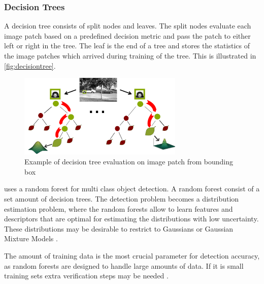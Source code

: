 \subsubsection{Decision Trees}
A decision tree consists of split nodes and leaves. The split nodes evaluate each image patch based on a predefined decision metric and pass the patch to either left or right in the tree. The leaf is the end of a tree and stores the statistics of the image patches which arrived during training of the tree. This is illustrated in \autoref{fig:decisiontree}.

\begin{figure}[H]
  \centering
  \includegraphics[width=0.7\textwidth]{figures/decisiontree}
  \caption{Example of decision tree evaluation on image patch from bounding box \citep{Gall2012}}
  \label{fig:decisiontree}
\end{figure}

\cite{Gall2012} uses a random forest for multi class object detection. A random forest consist of a set amount of decision trees.
The detection problem becomes a distribution estimation problem, where the random forests allow to learn features and descriptors that are optimal for estimating the distributions with low uncertainty. These distributions may be desirable to restrict to Gaussians or Gaussian Mixture Models \citep{Gall2012}.

The amount of training data is the most crucial parameter for detection accuracy, as random forests are designed to handle large amounts of data. If it is small training sets extra verification steps may be needed \citep{Gall2012}.

